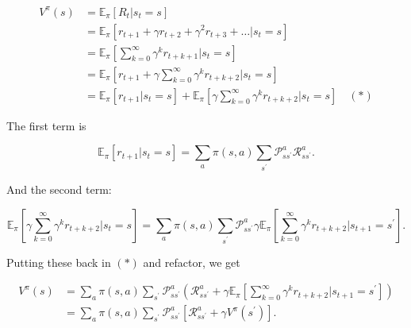\documentclass[17pt]{extarticle}
\theoremstyle{plain}
\theoremstyle{definition}
\theoremstyle{remark}
\newcommand{\0}{\varnothing}
\newcommand{\<}{\langle}
\renewcommand{\>}{\rangle}
\begin{document}
\begin{align*}
V ^ { \pi } ( s ) &= \mathbb { E } _ { \pi } \left[ R _ { t } | s _ { t } = s \right] \\
&= \mathbb { E } _ { \pi } \left[ r _ { t + 1 } + \gamma r _ { t + 2 } + \gamma ^ { 2 } r _ { t + 3 } + \ldots | s _ { t } = s \right] \\
&= \mathbb { E } _ { \pi } \left[ \sum _ { k = 0 } ^ { \infty } \gamma ^ { k } r _ { t + k + 1 } \bigg| s _ { t } = s \right] \\
&= \mathbb { E } _ { \pi } \left[ r _ { t + 1 } + \gamma \sum _ { k = 0 } ^ { \infty } \gamma ^ { k } r _ { t + k + 2 } \bigg| s _ { t } = s \right] \\
&= \mathbb { E } _ { \pi } \left[ r _ { t + 1 } | s _ { t } = s \right] + \mathbb { E } _ { \pi } \left[ \gamma \sum _ { k = 0 } ^ { \infty } \gamma ^ { k } r _ { t + k + 2 } \bigg| s _ { t } = s \right] \quad (*)
\end{align*}

The first term is

\[
\mathbb { E } _ { \pi } \left[ r _ { t + 1 } | s _ { t } = s \right] = \sum _ { a } \pi ( s , a ) \sum _ { s ^ { \prime } } \mathcal { P } _ { s s ^ { \prime } } ^ { a } \mathcal { R } _ { s s ^ { \prime } } ^ { a }.
\]

And the second term:

\[
\mathbb { E } _ { \pi } \left[ \gamma \sum _ { k = 0 } ^ { \infty } \gamma ^ { k } r _ { t + k + 2 } \bigg| s _ { t } = s \right] = \sum _ { a } \pi ( s , a ) \sum _ { s ^ { \prime } } \mathcal { P } _ { s s ^ { \prime } } ^ { a } \gamma \mathbb { E } _ { \pi } \left[ \sum _ { k = 0 } ^ { \infty } \gamma ^ { k } r _ { t + k + 2 } \bigg| s _ { t + 1 } = s ^ { \prime } \right].
\]

Putting these back in \( (*) \) and refactor, we get

\begin{align*}
V ^ { \pi } ( s ) &= \sum _ { a } \pi ( s , a ) \sum _ { s ^ { \prime } } \mathcal { P } _ { s s ^ { \prime } } ^ { a } \left( \mathcal { R } _ { s s ^ { \prime } } ^ { a } + \gamma \mathbb { E } _ { \pi } \left[ \sum _ { k = 0 } ^ { \infty } \gamma ^ { k } r _ { t + k + 2 } \bigg| s _ { t + 1 } = s ^ { \prime } \right] \right) \\
&= \sum _ { a } \pi ( s , a ) \sum _ { s ^ { \prime } } \mathcal { P } _ { s s ^ { \prime } } ^ { a } \left[ \mathcal { R } _ { s s ^ { \prime } } ^ { a } + \gamma V ^ { \pi } \left( s ^ { \prime } \right) \right].
\end{align*}
\end{document}
